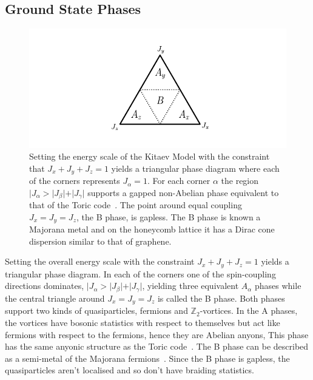 \hypertarget{ground-state-phases}{%
\subsection{Ground State Phases}\label{ground-state-phases}}

\hypertarget{fig:KH_phase_diagram}{%
\begin{figure}
\centering
\includegraphics[width=1\textwidth,height=\textheight]{figure_code/background_chapter/KH_phase_diagram}
\caption[{Kitaev Honeycomb Model Phase Diagram}]{Setting the energy scale of the Kitaev Model with the constraint that \(J_x + J_y + J_z = 1\) yields a triangular phase diagram where each of the corners represents \(J_\alpha = 1\). For each corner \(\alpha\) the region \(|J_\alpha > |J_\beta| + |J_\gamma|\) supports a gapped non-Abelian phase equivalent to that of the Toric code~\autocite{kitaev1997quantum,kitaev_fault-tolerant_2003}. The point around equal coupling \(J_x = J_y = J_z\), the B phase, is gapless. The B phase is known a Majorana metal and on the honeycomb lattice it has a Dirac cone dispersion similar to that of graphene.}
\label{fig:KH_phase_diagram}
\end{figure}
}

Setting the overall energy scale with the constraint \(J_x + J_y + J_z = 1\) yields a triangular phase diagram. In each of the corners one of the spin-coupling directions dominates, \(|J_\alpha > |J_\beta| + |J_\gamma|\), yielding three equivalent \(A_\alpha\) phases while the central triangle around \(J_x = J_y = J_z\) is called the B phase. Both phases support two kinds of quasiparticles, fermions and \(\mathbb{Z}_2\)-vortices. In the A phases, the vortices have bosonic statistics with respect to themselves but act like fermions with respect to the fermions, hence they are Abelian anyons, This phase has the same anyonic structure as the Toric code~\autocite{kitaev_fault-tolerant_2003}. The B phase can be described as a semi-metal of the Majorana fermions~\autocite{TrebstPhysRep2022}. Since the B phase is gapless, the quasiparticles aren't localised and so don't have braiding statistics.

